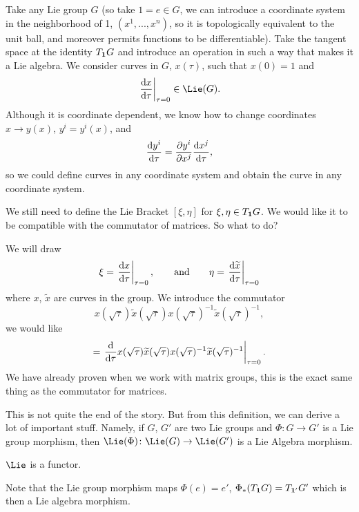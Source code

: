 Take any Lie group $G$ (so take $1=e\in G$, we can introduce a
coordinate system in the neighborhood of 1, $(x^1,...,x^n)$,
so it is topologically equivalent to the unit ball, and moreover
permits functions to be differentiable). Take the tangent space
at the identity $T_{{\bf 1}}G$ and introduce an operation in such
a way that makes it a Lie algebra. We consider curves in $G$,
$x(\tau)$, such that $x(0)=1$ and
\begin{equation}
\left.\frac{\D x}{\D \tau}\right|_{\tau=0}\in\Lie(G).
\end{equation}
Although it is coordinate dependent, we know how to change
coordinates $x\to y(x)$, $y^i=y^i(x)$, and
\begin{equation}
\frac{\mathrm{d} y^i}{\mathrm{d} \tau}=\frac{\partial y^i}{\partial x^j}\frac{\mathrm{d} x^j}{\mathrm{d} \tau},
\end{equation}
so we could define curves in any coordinate system and obtain the
curve in any coordinate system.

We still need to define the Lie Bracket $[\xi,\eta]$ for
$\xi,\eta\in T_{{\bf 1}}G$. We would like it to be compatible
with the commutator of matrices. So what to do?

We will draw
\begin{equation}
\xi=\left.\frac{\mathrm{d} x}{\mathrm{d} \tau}\right|_{\tau=0},\qquad\hbox{and}\qquad\eta=\left.\frac{\mathrm{d} \widetilde{x}}{\mathrm{d} \tau}\right|_{\tau=0}
\end{equation}
where $x$, $\widetilde{x}$ are curves in the group. We introduce
the commutator
\begin{equation}
x(\sqrt{\tau})\widetilde{x}(\sqrt{\tau})x(\sqrt{\tau})^{-1}\widetilde{x}(\sqrt{\tau})^{-1},
\end{equation}
we would like
\begin{equation}
[\xi,\eta]=\left.\frac{\D }{\D \tau}x(\sqrt{\tau})\widetilde{x}(\sqrt{\tau})x(\sqrt{\tau})^{-1}\widetilde{x}(\sqrt{\tau})^{-1}\right|_{\tau=0}.
\end{equation}
We have already proven when we work with matrix groups, this is
the exact same thing as the commutator for matrices.

This is not quite the end of the story. But from this definition,
we can derive a lot of important stuff. Namely, if $G$, $G'$ are
two Lie groups and $\Phi\colon G\to G'$ is a Lie group morphism,
then $\Lie(\Phi)\colon\Lie(G)\to\Lie(G')$ is a Lie Algebra
morphism.
\medbreak
\begin{prop}
$\Lie$ is a functor.
\end{prop}
\medbreak
Note that the Lie group morphism maps $\Phi(e)=e'$,
$\Phi_{*}(T_{{\bf 1}}G)=T_{{\bf 1}'}G'$ which is then a Lie
algebra morphism.

